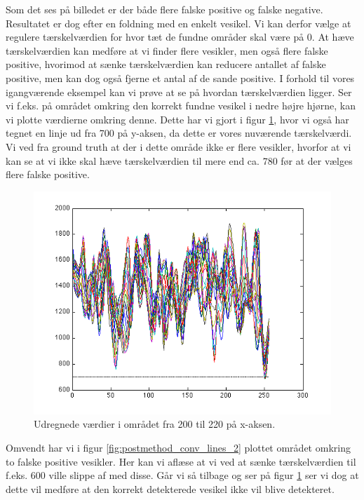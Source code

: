 Som det ses på billedet er der både flere falske positive og falske negative. Resultatet er dog efter en foldning med en enkelt vesikel. Vi kan derfor vælge at regulere tærskelværdien for hvor tæt de fundne områder skal være på 0. At hæve tærskelværdien kan medføre at vi finder flere vesikler, men også flere falske positive, hvorimod at sænke tærskelværdien kan reducere antallet af falske positive, men kan dog også fjerne et antal af de sande positive. I forhold til vores igangværende eksempel kan vi prøve at se på hvordan tærskelværdien ligger. Ser vi f.eks. på området omkring den korrekt fundne vesikel i nedre højre hjørne, kan vi plotte værdierne omkring denne. Dette har vi gjort i figur \ref{fig:postmethod_conv_lines_1}, hvor vi også har tegnet en linje ud fra 700 på y-aksen, da dette er vores nuværende tærskelværdi. Vi ved fra ground truth at der i dette område ikke er flere vesikler, hvorfor at vi kan se at vi ikke skal hæve tærskelværdien til mere end ca. 780 før at der vælges flere falske positive. 

\begin{figure}[H]
		\centering
		\includegraphics[scale=0.9]{files/postmethod/img/conv_lines_1.png}
	\caption{Udregnede værdier i området fra 200 til 220 på x-aksen. \label{fig:postmethod_conv_lines_1}}
\end{figure}

Omvendt har vi i figur \ref{fig:postmethod_conv_lines_2} plottet området omkring to falske positive vesikler. Her kan vi aflæse at vi ved at sænke tærskelværdien til f.eks. 600 ville slippe af med disse. Går vi så tilbage og ser på figur \ref{fig:postmethod_conv_lines_1} ser vi dog at dette vil medføre at den korrekt detekterede vesikel ikke vil blive detekteret.

